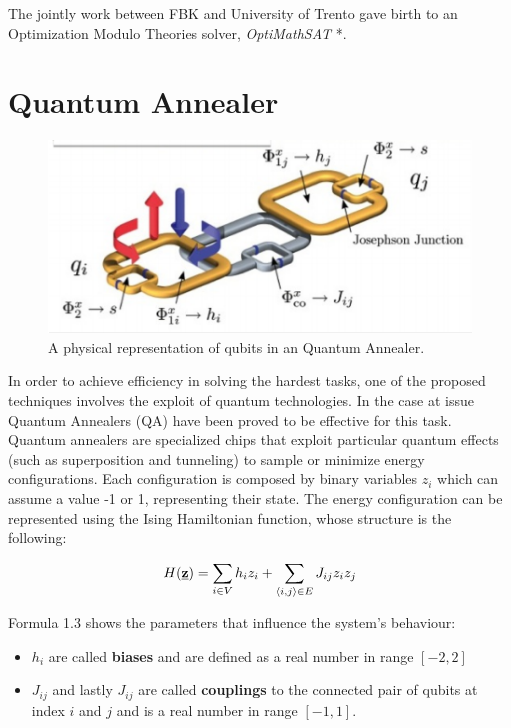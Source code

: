 The jointly work between FBK and University of Trento gave birth to an Optimization Modulo Theories solver, \textit{OptiMathSAT} \cite{pa25}*.

\section{Quantum Annealer}
\label{sec:quantum}

\begin{figure}[t]
	\begin{center}
	\includegraphics{images/QA.PNG}
	\caption{A physical representation of qubits in an Quantum Annealer.}
	\end{center}
\end{figure}
In order to achieve efficiency in solving the hardest tasks, one of the proposed techniques involves the exploit of quantum technologies. In the case at issue Quantum Annealers (QA) have been proved to be effective for this task. \\
Quantum annealers are specialized chips that exploit particular quantum effects (such as superposition and tunneling) to sample or minimize energy configurations. Each configuration is composed by binary variables $z_i$ which can assume a value -1 or 1, representing their state. The energy configuration can be represented using the Ising Hamiltonian function, whose structure is the following:

\begin{equation}
    H(\textbf{\underline{z}}) = \sum_{i \in V} h_iz_i + \sum_{\langle i,j\rangle \in E} J_{ij} z_iz_j
\end{equation}

Formula 1.3 shows the parameters that influence the system's behaviour: 

\begin{itemize}
    \item $h_i$ are called \textbf{biases} and are defined as a real number in range $[-2,2]$
    \item $J_{ij}$ and lastly $J_{ij}$ are called \textbf{couplings} to the connected pair of qubits at index $i$ and $j$ and is a real number in range $[-1,1]$.
\end{itemize}

